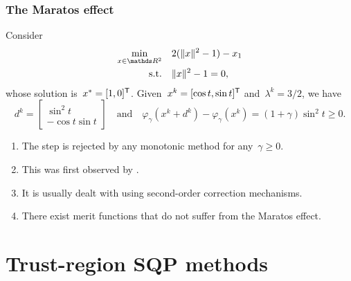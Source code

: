 \documentclass{polyu-presentation}
\begin{document}
\begin{frame}
    \frametitle{The Maratos effect}

    Consider
    \begin{align*}
        \min_{x \in \R^2}   & \quad 2(\norm{x}^2 - 1) - x_1\\
        \text{s.t.}         & \quad \norm{x}^2 - 1 = 0,
    \end{align*}
    whose \alert{solution} is~$x^{\ast} = [1, 0]^{\mathsf{T}}$.
    Given~$x^k = [\cos t, \sin t]^{\mathsf{T}}$ and~$\lambda^k = 3/2$, we have
    \begin{equation*}
        d^k =
        \begin{bmatrix}
            \sin^2 t\\
            - \cos t \sin t
        \end{bmatrix}
        \quad \text{and} \quad
        \varphi_{\gamma}(x^k + d^k) - \varphi_{\gamma}(x^k) = (1 + \gamma) \sin^2 t \ge 0.
    \end{equation*}

    \begin{block}{}
        \begin{enumerate}[<+(1)->]
            \item The step is \alert{rejected} by any \alert{monotonic} method for any~$\gamma \ge 0$.
            \item This was \alert{first observed} by \cite{Maratos_1978}.
            \item It is usually dealt with using \alert{second-order correction} mechanisms.
            \item There exist merit functions that do \alert{not} suffer from the Maratos effect.
        \end{enumerate}
    \end{block}
\end{frame}

\section{Trust-region SQP methods}
\end{document}
